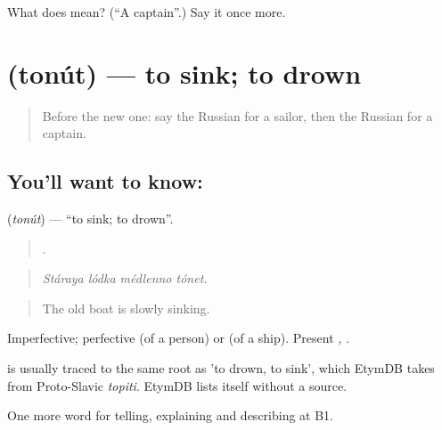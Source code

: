 \begin{tcolorbox}[breakable,colback=teal!4,colframe=teal!35!black,title={Before you move on}]
What does  mean? (\textquotedblleft{}A captain\textquotedblright{}.) Say it once more.
\end{tcolorbox}
\section[\texorpdfstring{\ru{тонуть} (tonút)}{тонуть (tonút)}]{ (tonút) — to sink; to drown}

\label{lesson:RU-C427-tonut}



\begin{quote}
Before the new one: say the Russian for a sailor, then the Russian for a captain.
\end{quote}

\subsection*{You'll want to know: }
\textbf{} (\emph{tonút}) — \textquotedblleft{}to sink; to drown\textquotedblright{}.

\begin{quote}
   .
\end{quote}

\begin{quote}
\emph{Stáraya lódka médlenno tónet.}
\end{quote}

\begin{quote}
The old boat is slowly sinking.
\end{quote}

Imperfective; perfective \emph{} (of a person) or \emph{} (of a ship). Present \emph{, }.

\begin{cousinweb}
\emph{} is usually traced to the same root as \emph{} 'to drown, to sink', which EtymDB takes from Proto-Slavic \emph{topiti}. EtymDB lists \emph{} itself without a source.
\end{cousinweb}

\begin{grammarlens}[title={What you've built}]
One more word for telling, explaining and describing at B1.
\end{grammarlens}


